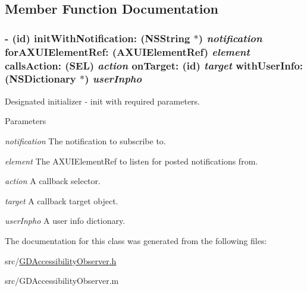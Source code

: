 \subsection{Member Function Documentation}
\hypertarget{interface_g_d_accessibility_observer_a38b7e5cbcdd5a9d4ff0e61fef5fede37}{
\subsubsection[{initWithNotification:forAXUIElementRef:callsAction:onTarget:withUserInfo:}]{\setlength{\rightskip}{0pt plus 5cm}-\/ (id) initWithNotification: (NSString $\ast$) {\em notification}\/ forAXUIElementRef: (AXUIElementRef) {\em element}\/ callsAction: (SEL) {\em action}\/ onTarget: (id) {\em target}\/ withUserInfo: (NSDictionary $\ast$) {\em userInpho}}}
\label{interface_g_d_accessibility_observer_a38b7e5cbcdd5a9d4ff0e61fef5fede37}


Designated initializer -\/ init with required parameters. 
\begin{DoxyParams}{Parameters}
\item[{\em notification}]The notification to subscribe to. \item[{\em element}]The AXUIElementRef to listen for posted notifications from. \item[{\em action}]A callback selector. \item[{\em target}]A callback target object. \item[{\em userInpho}]A user info dictionary. \end{DoxyParams}


The documentation for this class was generated from the following files:\begin{DoxyCompactItemize}
\item 
src/\hyperlink{_g_d_accessibility_observer_8h}{GDAccessibilityObserver.h}\item 
src/GDAccessibilityObserver.m\end{DoxyCompactItemize}
